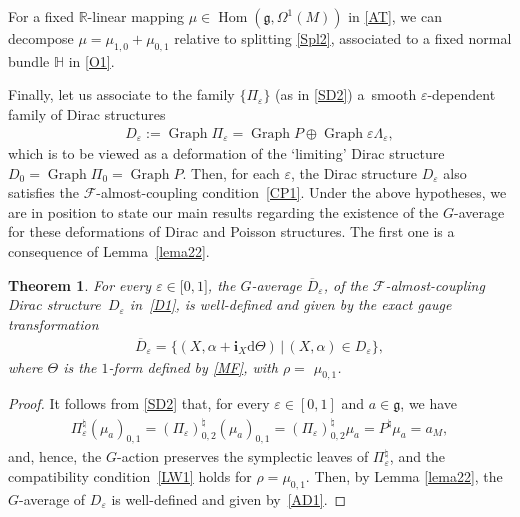 \documentclass[10pt,a4paper]{amsart}
\numberwithin{equation}{section}
\newtheorem{Theorem}{Theorem}[section]
\begin{document}
For a f\/ixed $\mathbb{R}$-linear mapping
$\mu\in\operatorname*{Hom}(\mathfrak{g},\Omega^{1}(M))$ in \eqref{AT}, we can decompose $\mu=\mu_{1,0}+\mu_{0,1}$ relative to splitting \eqref{Spl2},
associated to a f\/ixed normal bundle $\mathbb{H}$ in \eqref{O1}.

Finally, let us associate to the family $\{\Pi_{\varepsilon}\}$ (as in \eqref{SD2}) a~smooth $\varepsilon$-dependent family of Dirac structures
\begin{gather}\label{D1}%
D_{\varepsilon}:=\operatorname*{Graph}\Pi_{\varepsilon}=\operatorname*{Graph} P\oplus\operatorname*{Graph}\varepsilon\Lambda_{\varepsilon},
\end{gather}
which is to be viewed as a deformation of the `limiting' Dirac structure $D_{0}=\operatorname*{Graph}\Pi_{0}=\operatorname*{Graph}P$. Then, for each
$\varepsilon$, the Dirac structure $D_{\varepsilon}$ also satisf\/ies the $\mathcal{F}$-almost-coupling condition~\eqref{CP1}. Under the above hypotheses, we are in position to state our main results regarding the existence of the $G$-average for these deformations of Dirac and Poisson structures. The f\/irst one is a consequence of Lemma~\ref{lema22}.
\begin{Theorem}
For every $\varepsilon\in\lbrack0,1]$, the $G$-average $\overline{D}_{\varepsilon}$, of the $\mathcal{F}$-almost-coupling Dirac structure~$D_{\varepsilon}$ in~\eqref{D1}, is well-defined and given by the exact gauge transformation
\begin{gather}\label{AD1}
\overline{D}_{\varepsilon}=\{(X,\alpha+\mathbf{i}_{X}\mathrm{d}\Theta)\,|\,(X,\alpha)\in D_{\varepsilon}\},
\end{gather}
where $\Theta$ is the $1$-form defined by \eqref{MF}, with $\rho=$ $\mu_{0,1}$.
\end{Theorem}
\begin{proof}
It follows from \eqref{SD2} that, for every $\varepsilon\in [0,1]$ and $a\in\mathfrak{g}$, we have
\begin{gather*}
\Pi_{\varepsilon}^{\natural}(\mu_{a})_{0,1}=(\Pi_{\varepsilon})_{0,2}^{\natural}(\mu_{a})_{0,1}=(\Pi_{\varepsilon})_{0,2}^{\natural}\mu
_{a}=P^{\natural}\mu_{a}=a_{M},
\end{gather*}
and, hence, the $G$-action preserves the symplectic leaves of $\Pi_{\varepsilon}^{\natural}$, and the compatibility condition~\eqref{LW1} holds for
$\rho=\mu_{0,1}$. Then, by Lemma \ref{lema22}, the $G$-average of $D_{\varepsilon}$ is well-def\/ined and given by~\eqref{AD1}.
\end{proof}
\end{document}
